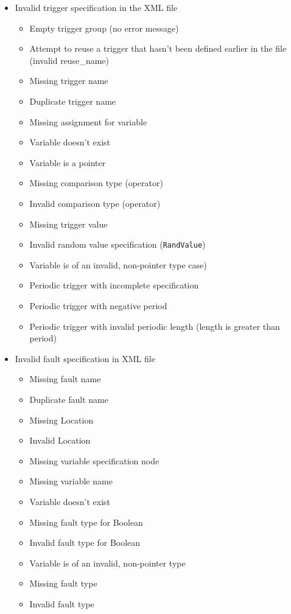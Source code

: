 \documentclass[11pt,fleqn]{report}
\begin{document}
\begin{itemize}
\item Invalid trigger specification in the XML file
  \begin{itemize}
  \item Empty trigger group (no error message)
  \item Attempt to reuse a trigger that hasn't been defined earlier in the
        file (invalid reuse\_name)
  \item Missing trigger name
  \item Duplicate trigger name
  \item Missing assignment for variable
  \item Variable doesn't exist
  \item Variable is a pointer
  \item Missing comparison type (operator)
  \item Invalid comparison type (operator)
  \item Missing trigger value
  \item Invalid random value specification (\verb"RandValue")
  \item Variable is of an invalid, non-pointer type
        case)
  \item Periodic trigger with incomplete specification
  \item Periodic trigger with negative period
  \item Periodic trigger with invalid periodic length (length is greater than
        period)
  \end{itemize}
\item Invalid fault specification in XML file
  \begin{itemize}
  \item Missing fault name
  \item Duplicate fault name
  \item Missing Location
  \item Invalid Location
  \item Missing variable specification node
  \item Missing variable name
  \item Variable doesn't exist
  \item Missing fault type for Boolean
  \item Invalid fault type for Boolean
  \item Variable is of an invalid, non-pointer type
  \item Missing fault type
  \item Invalid fault type

\end{itemize}
\end{itemize}
\end{document}
